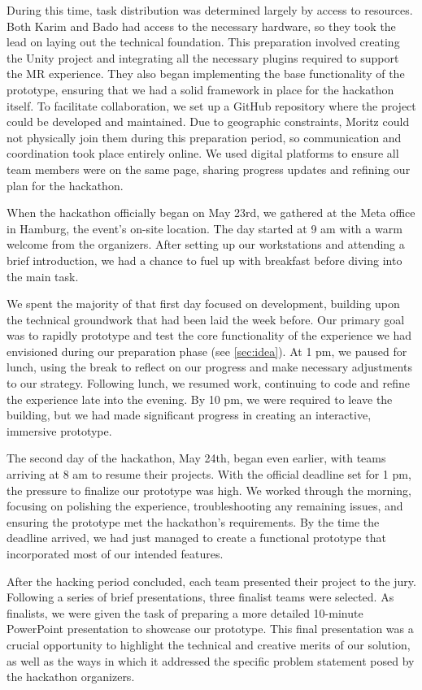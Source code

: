 \documentclass[12pt]{article}
\begin{document}
During this time, task distribution was determined largely by access to resources. Both Karim and Bado had access to the necessary hardware, so they took the lead on laying out the technical foundation. This preparation involved creating the Unity project and integrating all the necessary plugins required to support the MR experience. They also began implementing the base functionality of the prototype, ensuring that we had a solid framework in place for the hackathon itself. To facilitate collaboration, we set up a GitHub repository where the project could be developed and maintained. Due to geographic constraints, Moritz could not physically join them during this preparation period, so communication and coordination took place entirely online. We used digital platforms to ensure all team members were on the same page, sharing progress updates and refining our plan for the hackathon.

When the hackathon officially began on May 23rd, we gathered at the Meta office in Hamburg, the event’s on-site location. The day started at 9 am with a warm welcome from the organizers. After setting up our workstations and attending a brief introduction, we had a chance to fuel up with breakfast before diving into the main task. 

We spent the majority of that first day focused on development, building upon the technical groundwork that had been laid the week before. Our primary goal was to rapidly prototype and test the core functionality of the experience we had envisioned during our preparation phase (see \autoref{sec:idea}). At 1 pm, we paused for lunch, using the break to reflect on our progress and make necessary adjustments to our strategy. Following lunch, we resumed work, continuing to code and refine the experience late into the evening. By 10 pm, we were required to leave the building, but we had made significant progress in creating an interactive, immersive prototype.

The second day of the hackathon, May 24th, began even earlier, with teams arriving at 8 am to resume their projects. With the official deadline set for 1 pm, the pressure to finalize our prototype was high. We worked through the morning, focusing on polishing the experience, troubleshooting any remaining issues, and ensuring the prototype met the hackathon's requirements. By the time the deadline arrived, we had just managed to create a functional prototype that incorporated most of our intended features.

After the hacking period concluded, each team presented their project to the jury. Following a series of brief presentations, three finalist teams were selected. As finalists, we were given the task of preparing a more detailed 10-minute PowerPoint presentation to showcase our prototype. This final presentation was a crucial opportunity to highlight the technical and creative merits of our solution, as well as the ways in which it addressed the specific problem statement posed by the hackathon organizers.
\end{document}

